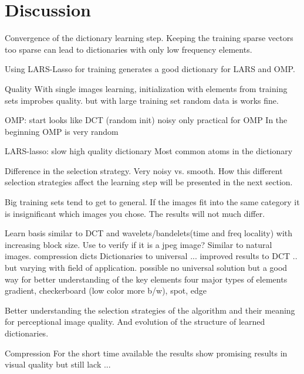 \chapter{Discussion}

Convergence of the dictionary learning step.
Keeping the training sparse vectors too sparse can lead to dictionaries with
only low frequency elements. 

Using LARS-Lasso for training generates a good dictionary for LARS and OMP. 

Quality
With single images learning, initialization with elements from training sets
improbes quality. but with large training set random data is works fine.

OMP:
  start looks like DCT (random init)
  noisy
  only practical for OMP
  In the beginning OMP is very random

LARS-lasso:
  slow 
  high quality dictionary
  Most common atoms in the dictionary 

Difference in the selection strategy.
Very noisy vs. smooth. 
How this different selection strategies affect the learning step will be
presented in the next section.

Big training sets tend to get to general.
If the images fit into the same category it is insignificant which images you
chose. The results will not much differ.

Learn basis similar to DCT and wavelets/bandelets(time and freq locality) with
increasing block size. Use to verify if it is a jpeg image?
Similar to natural images.
compression dicts
Dictionaries to universal ... improved results to DCT .. but varying with field
of application. possible no universal solution but a good way for better
understanding of the key elements
  four major types of elements
  gradient, checkerboard (low color more b/w), spot, edge


Better understanding the selection strategies of the algorithm and their
meaning for perceptional image quality. And evolution of the structure of
learned dictionaries. 

Compression
For the short time available the results show promising results in visual
quality but still lack ...

